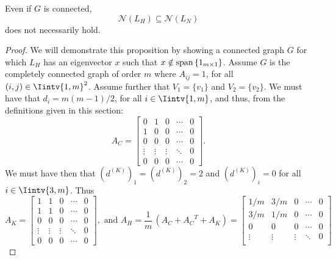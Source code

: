 \begin{proposition} \label{spanOfLh}
   Even if $G$ is connected, 
   \begin{equation}
      \mathcal N (L_H) \subseteq \mathcal N (L_N)
   \end{equation}
   does not necessarily hold.
\end{proposition}
\begin{proof}
   We will demonstrate this proposition by showing a connected graph $G$ for which $L_H$ has an eigenvector $x$ such that $x \notin \mathcal {\operatorname{span\,}} \{ 1_{m \times 1} \}$. 
   Assume $G$ is the completely connected graph of order $m$ where $A_{ij} = 1$, for all $(i,j) \in \Iintv{1,m}^2$.
   Assume further that $V_1 = \{ v_1 \}$ and $V_2 = \{ v_2 \}$.
   We must have that $d_i = m(m-1)/2$, for all $i \in \Iintv{1,m}$, and thus, from the definitions given in this section:
   \begin{equation*}
      A_C = 
      \begin{bmatrix}
         0 & 1 & 0 & \cdots & 0 \\
         1 & 0 & 0 & \cdots & 0 \\
         0 & 0 & 0 & \cdots & 0 \\
         \vdots & \vdots & \vdots & \ddots & 0 \\
         0 & 0 & 0 & \cdots & 0 
      \end{bmatrix}.
   \end{equation*}
   We must have then that $\left( d^{(K)} \right) _1 = \left( d^{(K)} \right)_2 = 2$ and $\left( d^{(K)} \right)_i = 0$ for all $i \in \Iintv{3,m}$. Thus
   \begin{equation*}
      A_K =
      \begin{bmatrix}
         1 & 1 & 0 & \cdots & 0 \\
         1 & 1 & 0 & \cdots & 0 \\
         0 & 0 & 0 & \cdots & 0 \\
         \vdots & \vdots & \vdots & \ddots & 0 \\
         0 & 0 & 0 & \cdots & 0 
      \end{bmatrix},
      \text{ and }
      A_H = \frac{1}{m} \, (A_C + {A_C}^T + A_K) = 
      \begin{bmatrix}
         1/m & 3/m & 0 & \cdots & 0 \\
         3/m & 1/m & 0 & \cdots & 0 \\
         0 & 0 & 0 & \cdots & 0 \\
         \vdots & \vdots & \vdots & \ddots & 0 \\

\end{bmatrix}
\end{equation*}
\end{proof}

